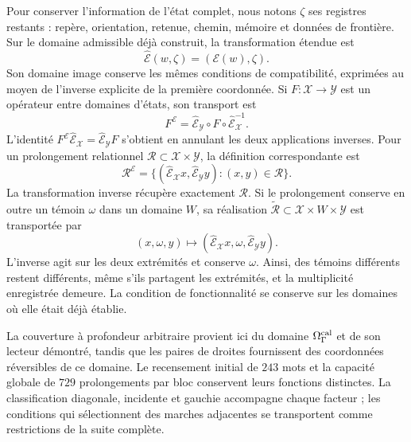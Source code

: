 Pour conserver l’information de l’état complet, nous notons
\(\zeta\) ses registres restants : repère, orientation, retenue,
chemin, mémoire et données de frontière. Sur le domaine admissible déjà
construit, la transformation étendue est
\[
 \widehat{\mathcal E}(w,\zeta)=(\mathcal E(w),\zeta).
\]
Son domaine image conserve les mêmes conditions de compatibilité,
exprimées au moyen de l’inverse explicite de la première coordonnée. Si
\(F:\mathcal X\to\mathcal Y\) est un opérateur entre domaines d’états,
son transport est
\[
 F^{\mathcal E}
 =\widehat{\mathcal E}_{\mathcal Y}\circ F
       \circ\widehat{\mathcal E}_{\mathcal X}^{-1}.
\]
L’identité \(F^{\mathcal E}\widehat{\mathcal E}_{\mathcal X}
=\widehat{\mathcal E}_{\mathcal Y}F\) s’obtient en annulant les deux
applications inverses. Pour un prolongement relationnel
\(\mathcal R\subset\mathcal X\times\mathcal Y\), la définition
correspondante est
\[
 \mathcal R^{\mathcal E}
 =\{(\widehat{\mathcal E}_{\mathcal X}x,
       \widehat{\mathcal E}_{\mathcal Y}y):(x,y)\in\mathcal R\}.
\]
La transformation inverse récupère exactement \(\mathcal R\).
Si le prolongement conserve en outre un témoin \(\omega\) dans un domaine
\(W\), sa réalisation \(\widetilde{\mathcal R}\subset
\mathcal X\times W\times\mathcal Y\) est transportée par
\[
 (x,\omega,y)\longmapsto
 (\widehat{\mathcal E}_{\mathcal X}x,\omega,
       \widehat{\mathcal E}_{\mathcal Y}y).
\]
L’inverse agit sur les deux extrémités et conserve \(\omega\). Ainsi,
des témoins différents restent différents, même s’ils partagent les
extrémités, et la multiplicité enregistrée demeure. La condition de
fonctionnalité se conserve sur les domaines où elle était déjà établie.

La couverture à profondeur arbitraire provient ici du domaine
\(\Omega_\Gamma^{\rm cal}\) et de son lecteur démontré, tandis que les
paires de droites fournissent des coordonnées réversibles de ce domaine.
Le recensement initial de \(243\) mots et la capacité globale de
\(729\) prolongements par bloc conservent leurs fonctions distinctes.
La classification diagonale, incidente et gauchie accompagne chaque facteur ;
les conditions qui sélectionnent des marches adjacentes se transportent comme
restrictions de la suite complète.


